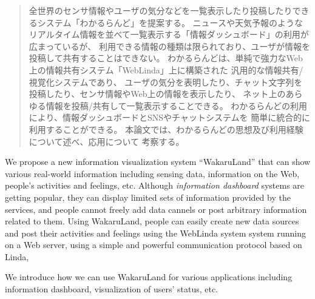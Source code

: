 \begin{abstract}
  全世界のセンサ情報やユーザの気分などを一覧表示したり投稿したりできるシステム「わかるらんど」を提案する。
  ニュースや天気予報のようなリアルタイム情報を並べて一覧表示する「情報ダッシュボード」の利用が広まっているが、
  利用できる情報の種類は限られており、ユーザが情報を投稿して共有することはできない。
  わかるらんどは、単純で強力なWeb上の情報共有システム「WebLinda」上に構築された
  汎用的な情報共有/視覚化システムであり、
  ユーザの気分を表明したり、チャット文字列を投稿したり、センサ情報やWeb上の情報を表示したり、
  ネット上のあらゆる情報を投稿/共有して一覧表示することできる。
  わかるらんどの利用により、情報ダッシュボードとSNSやチャットシステムを
  簡単に統合的に利用することができる。
  本論文では、わかるらんどの思想及び利用経験について述べ、応用について
  考察する。
\end{abstract}

\begin{eabstract}
  We propose a new information visualization system ``WakaruLand'' that can show
  various real-world information including sensing data, information on the Web,
  people's activities and feelings, etc.
  Although \textit{information dashboard} systems are getting popular,
  they can display limited sets of information provided by the services,
  and people cannot freely add data cannels or post arbitrary
  information related to them.
  Using WakaruLand, people can easily create new data sources and
  post their activities and feelings using the WebLinda system
  system running on a Web server,
  using a simple and powerful communication protocol based on Linda,
  
  We introduce how we can use WakaruLand for various applications
  including information dashboard, visualization of users' status, etc.
\end{eabstract}

